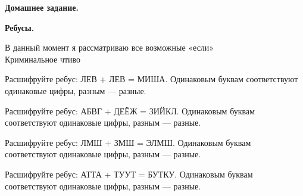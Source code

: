 \hspace{3mm}

\centerline{\bf \Huge Домашнее задание.}
\centerline{\bf \Huge Ребусы.}

\begin{flushright}
    \scriptsize{В данный момент я рассматриваю все возможные «если»\\Криминальное чтиво}
\end{flushright}

 Расшифруйте ребус: ЛЕВ + ЛЕВ = МИША. Одинаковым буквам соответствуют одинаковые цифры, разным — разные.

 Расшифруйте ребус: АБВГ + ДЕЁЖ = ЗИЙКЛ. Одинаковым буквам соответствуют одинаковые цифры, разным — разные.

 Расшифруйте ребус: ЛМШ + ЗМШ = ЭЛМШ. Одинаковым буквам соответствуют одинаковые цифры, разным — разные.

 Расшифруйте ребус: АТТА + ТУУТ = БУТКУ. Одинаковым буквам соответствуют одинаковые цифры, разным — разные.